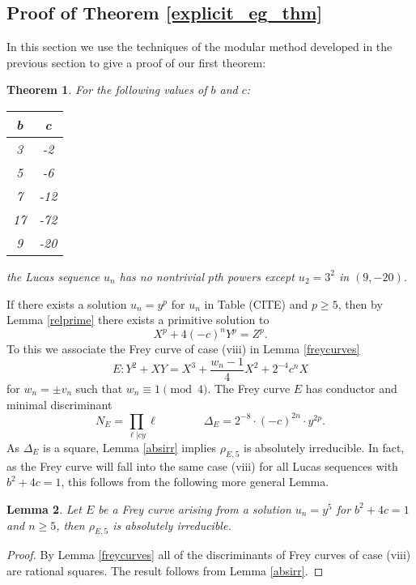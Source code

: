 \documentclass[12pt]{amsart}
\newtheorem{thm}{Theorem}[section]
\newtheorem{lem}[thm]{Lemma}
\theoremstyle{definition}
\begin{document}
\subsection{Proof of Theorem \ref{explicit_eg_thm}}

In this section we use the techniques of the modular method developed in the previous section to give a proof of our first theorem:

\begin{thm}\label{explicit_eg_thm_inplace}
For the following values of $b$ and $c$:
\begin{center}
\begin{tabular}{c | c }
b & c \\  \hline \hline
3 & -2 \\
5 & -6  \\
7 & -12 \\
17 & -72  \\
9 & -20 \\ \hline \hline
\end{tabular}
\end{center}
the Lucas sequence $u_n$ has no nontrivial $p$th powers except $u_2=3^2$ in $(9,-20)$. 
\end{thm}


If there exists a solution $u_n = y^p$ for $u_n$ in Table (CITE) and $p \geq 5$, then by Lemma \ref{relprime} there exists a primitive solution to 
\[ X^p + 4(-c)^n Y^p = Z^p. \]
To this we associate the Frey curve of case (viii) in Lemma \ref{freycurves}
\[E: Y^2 + XY = X^3 + \frac{w_n - 1}{4} X^2 + 2^{-4}c^nX \]
for $w_n = \pm v_n$ such that $w_n \equiv 1 \pmod{4}$.  The Frey curve $E$ has conductor and minimal discriminant
\[ N_E =\prod_{\ell | cy} \ell  \qquad \qquad \Delta_E = 2^{-8} \cdot (-c)^{2n} \cdot y^{2p}. \]
As $\Delta_E$ is a square, Lemma \ref{absirr} implies $\rho_{E,5}$ is absolutely irreducible.  In fact, as the Frey curve will fall into the same case (viii) for all Lucas sequences with $b^2+4c=1$, this follows from the following more general Lemma.

\begin{lem}\label{frey5irr}
Let $E$ be a Frey curve arising from a solution $u_n = y^5$ for $b^2+4c = 1$ and $n\geq 5$, then $\rho_{E,5}$ is absolutely irreducible.
\end{lem}
\begin{proof}
By Lemma \ref{freycurves} all of the discriminants of Frey curves of case (viii) are rational squares.  The result follows from Lemma \ref{absirr}.
\end{proof}
\end{document}
